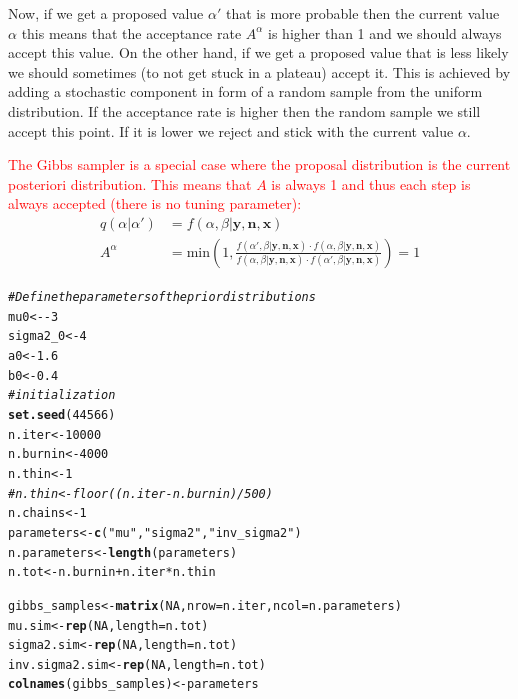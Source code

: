 \documentclass{article}\usepackage[]{graphicx}\usepackage[]{xcolor}
\makeatletter
\newcommand{\hlnum}[1]{\textcolor[rgb]{0.686,0.059,0.569}{#1}}%
\newcommand{\hlstr}[1]{\textcolor[rgb]{0.192,0.494,0.8}{#1}}%
\newcommand{\hlcom}[1]{\textcolor[rgb]{0.678,0.584,0.686}{\textit{#1}}}%
\newcommand{\hlopt}[1]{\textcolor[rgb]{0,0,0}{#1}}%
\newcommand{\hlstd}[1]{\textcolor[rgb]{0.345,0.345,0.345}{#1}}%
\newcommand{\hlkwb}[1]{\textcolor[rgb]{0.69,0.353,0.396}{#1}}%
\newcommand{\hlkwc}[1]{\textcolor[rgb]{0.333,0.667,0.333}{#1}}%
\newcommand{\hlkwd}[1]{\textcolor[rgb]{0.737,0.353,0.396}{\textbf{#1}}}%
\newenvironment{kframe}{%
 \def\at@end@of@kframe{}%
 \ifinner\ifhmode%
  \def\at@end@of@kframe{\end{minipage}}%
  \begin{minipage}{\columnwidth}%
 \fi\fi%
 \def\FrameCommand##1{\hskip\@totalleftmargin \hskip-\fboxsep
 \colorbox{shadecolor}{##1}\hskip-\fboxsep
     \hskip-\linewidth \hskip-\@totalleftmargin \hskip\columnwidth}%
 \MakeFramed {\advance\hsize-\width
   \@totalleftmargin\z@ \linewidth\hsize
   \@setminipage}}%
 {\par\unskip\endMakeFramed%
 \at@end@of@kframe}
\newenvironment{knitrout}{}{} %
\makeatother
\begin{document}
\begin{multicols*}{2}
Now, if we get a proposed value $\alpha'$ that is more probable then the current value $\alpha$ this means that the acceptance rate $A^{\alpha}$ is higher than 1 and we should always accept this value. On the other hand, if we get a proposed value that is less likely we should sometimes (to not get stuck in a plateau) accept it. This is achieved by adding a stochastic component in form of a random sample from the uniform distribution. If the acceptance rate is higher then the random sample we still accept this point. If it is lower we reject and stick with the current value $\alpha$.

\textcolor{red}{The Gibbs sampler is a special case where the proposal distribution is the current posteriori distribution. This means that $A$ is always 1 and thus each step is always accepted (there is no tuning parameter):}
\begin{align*}
q(\alpha|\alpha') &= f(\alpha,\beta|\boldsymbol{y,n,x})\\
A^{\alpha}&=\text{min}\left(1,\frac{f(\alpha',\beta|\boldsymbol{y,n,x})\cdot f(\alpha,\beta|\boldsymbol{y,n,x})}{f(\alpha,\beta|\boldsymbol{y,n,x})\cdot f(\alpha',\beta|\boldsymbol{y,n,x})}\right)=1
\end{align*}

\tiny


\begin{knitrout}
\color{fgcolor}\begin{kframe}
\begin{alltt}
\hlcom{#Define the parameters of the prior distributions}
\hlstd{mu0} \hlkwb{<-} \hlopt{-}\hlnum{3}
\hlstd{sigma2_0} \hlkwb{<-} \hlnum{4}
\hlstd{a0} \hlkwb{<-} \hlnum{1.6}
\hlstd{b0} \hlkwb{<-} \hlnum{0.4}
\hlcom{# initialization}
\hlkwd{set.seed}\hlstd{(}\hlnum{44566}\hlstd{)}
\hlstd{n.iter} \hlkwb{<-} \hlnum{10000}
\hlstd{n.burnin} \hlkwb{<-} \hlnum{4000}
\hlstd{n.thin} \hlkwb{<-} \hlnum{1}
\hlcom{#n.thin <- floor((n.iter-n.burnin)/500)}
\hlstd{n.chains} \hlkwb{<-} \hlnum{1}
\hlstd{parameters} \hlkwb{<-} \hlkwd{c}\hlstd{(}\hlstr{"mu"}\hlstd{,} \hlstr{"sigma2"}\hlstd{,} \hlstr{"inv_sigma2"}\hlstd{)}
\hlstd{n.parameters} \hlkwb{<-} \hlkwd{length}\hlstd{(parameters)}
\hlstd{n.tot} \hlkwb{<-} \hlstd{n.burnin} \hlopt{+} \hlstd{n.iter}\hlopt{*}\hlstd{n.thin}

\hlstd{gibbs_samples} \hlkwb{<-} \hlkwd{matrix}\hlstd{(}\hlnum{NA}\hlstd{,} \hlkwc{nrow} \hlstd{= n.iter,} \hlkwc{ncol} \hlstd{= n.parameters)}
\hlstd{mu.sim} \hlkwb{<-} \hlkwd{rep}\hlstd{(}\hlnum{NA}\hlstd{,} \hlkwc{length} \hlstd{= n.tot)}
\hlstd{sigma2.sim} \hlkwb{<-} \hlkwd{rep}\hlstd{(}\hlnum{NA}\hlstd{,} \hlkwc{length} \hlstd{= n.tot)}
\hlstd{inv.sigma2.sim} \hlkwb{<-} \hlkwd{rep}\hlstd{(}\hlnum{NA}\hlstd{,} \hlkwc{length} \hlstd{= n.tot)}
\hlkwd{colnames}\hlstd{(gibbs_samples)} \hlkwb{<-} \hlstd{parameters}


\end{alltt}
\end{kframe}
\end{knitrout}
\end{multicols*}
\end{document}
